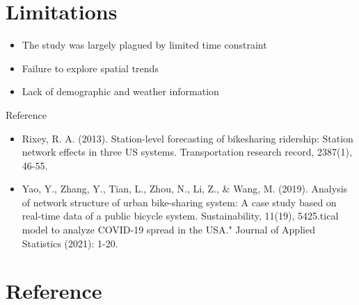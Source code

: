 \documentclass[11pt, xcolor=dvipsnames]{beamer}
\begin{document}
\section{Limitations}
\begin{frame}
	\begin{itemize}
		\item The study was largely plagued by limited time constraint
		\item Failure to explore spatial trends
		\item Lack of demographic and weather information
	\end{itemize}
\end{frame}
 \begin{frame}{Reference}
 	\begin{itemize}
 	 \item Rixey, R. A. (2013). Station-level forecasting of bikesharing ridership: Station network effects in three US systems. Transportation research record, 2387(1), 46-55.
 	
 	\item Yao, Y., Zhang, Y., Tian, L., Zhou, N., Li, Z., \& Wang, M. (2019). Analysis of network structure of urban bike-sharing system: A case study based on real-time data of a public bicycle system. Sustainability, 11(19), 5425.tical model to analyze COVID-19 spread in the USA." Journal of Applied Statistics (2021): 1-20.
 	\end{itemize}
 \end{frame}

	
	\section*{Reference}
\end{document}
